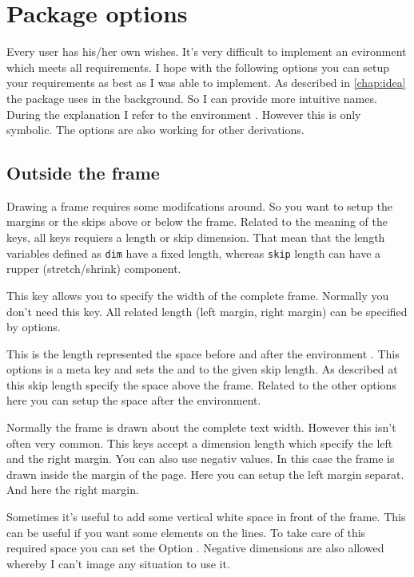 \documentclass[openany,12pt,tocdepth=3]{ltx-md}
\begin{document}
\chapter{Package options}\label{chap:options}
Every user has his/her own wishes. It's very difficult to implement an evironment 
which meets all requirements. I hope with the following options you can setup your 
requirements as best as I was able to implement. As described in \autoref{chap:idea}
the package uses  in the background. So I can provide more intuitive names.
During the explanation I refer to the environment . However this is only
symbolic. The options are also working for other derivations. 

\section{Outside the frame}
Drawing a frame requires some modifcations around. So you want to setup the margins
or the skips above or below the frame. Related to the meaning of the keys, all keys 
requiers a length or skip dimension. That mean that the length variables defined as
\texttt{dim} have a fixed length, whereas \texttt{skip} length can have a rupper (stretch/shrink) component. 

\ExplOpt[\string\linewidth]{width}
This key allows you to specify the width of the complete frame. 
Normally you don't need this key. All related length (left margin, right margin)
can be specified by options. 


This is the length represented the space before and after the environment .  
This options is a meta key and sets the  and  to the given skip length. 
As described at  this skip length specify the space above the frame.
Related to the other options here you can setup the space after the environment.


Normally the frame  is drawn about the complete text width. However this isn't
often very common. This keys accept a dimension length which specify the left and the right margin.
You can also use negativ values. In this case the frame is drawn inside the margin of the page.
Here you can setup the left margin separat. 
And here the right margin. 

Sometimes it's useful to add some vertical white space in front of the frame. This can be useful
if you want some elements on the lines. To take care of this required space you can
set the Option . Negative dimensions are also allowed whereby I can't
image any situation to use it. 
\end{document}
